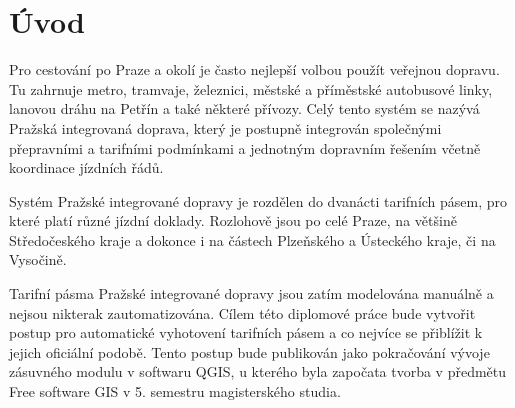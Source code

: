 \chapter*{Úvod}
\label{1-uvod}

Pro cestování po Praze a okolí je často nejlepší volbou použít veřejnou dopravu.
Tu zahrnuje metro, tramvaje, železnici, městské a příměstské autobusové linky,
lanovou dráhu na Petřín a také některé přívozy. Celý tento systém se nazývá 
Pražská integrovaná doprava, který je postupně integrován společnými přepravními
a tarifními podmínkami a jednotným dopravním řešením včetně koordinace jízdních řádů.

Systém Pražské integrované dopravy je rozdělen do dvanácti tarifních pásem, pro
které platí různé jízdní doklady. Rozlohově jsou po celé Praze, na většině
Středočeského kraje a dokonce i na částech Plzeňského a Ústeckého kraje, či na Vysočině.

Tarifní pásma Pražské integrované dopravy jsou zatím modelována manuálně a nejsou
nikterak zautomatizována. Cílem této diplomové práce bude vytvořit postup pro
automatické vyhotovení tarifních pásem a co nejvíce se přiblížit k jejich
oficiální podobě. Tento postup bude publikován jako pokračování vývoje zásuvného modulu
v softwaru QGIS, u kterého byla započata tvorba v předmětu Free software GIS
v 5. semestru magisterského studia.


